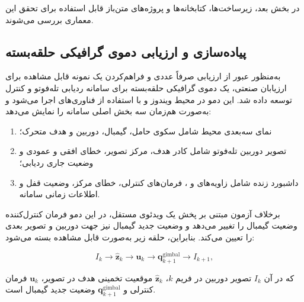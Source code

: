 \documentclass[12pt,a4paper]{article}
\begin{document}
	
	در بخش بعد، زیرساخت‌ها، کتابخانه‌ها و پروژه‌های متن‌باز قابل
	استفاده برای تحقق این معماری بررسی می‌شوند.













\subsection{پیاده‌سازی و ارزیابی دموی گرافیکی حلقه‌بسته}
\label{subsec:graphical_closed_loop_demo}

به‌منظور عبور از ارزیابی صرفاً عددی و فراهم‌کردن یک نمونه قابل
مشاهده برای ارزیابان صنعتی، یک دموی گرافیکی حلقه‌بسته برای سامانه
ردیابی تله‌فوتو و کنترل  توسعه داده شد. این دمو در
محیط ویندوز و با استفاده از فناوری‌های
اجرا می‌شود و به‌صورت هم‌زمان سه بخش اصلی سامانه را نمایش می‌دهد:

\begin{enumerate}
	\item
	نمای سه‌بعدی محیط شامل سکوی حامل، گیمبال، دوربین و هدف متحرک؛
	
	\item
	تصویر دوربین تله‌فوتو شامل کادر هدف، مرکز تصویر، خطای افقی و
	عمودی و وضعیت جاری ردیابی؛
	
	\item
	داشبورد زنده شامل زاویه‌های  و ، فرمان‌های
	کنترلی، خطای مرکز، وضعیت قفل و اطلاعات زمانی سامانه.
\end{enumerate}

برخلاف آزمون مبتنی بر پخش یک ویدئوی مستقل، در این دمو فرمان
کنترل‌کننده وضعیت گیمبال را تغییر می‌دهد و وضعیت جدید گیمبال نیز
جهت دوربین و تصویر بعدی را تعیین می‌کند. بنابراین، حلقه زیر به‌صورت
قابل مشاهده بسته می‌شود:

\begin{equation}
	I_k
	\longrightarrow
	\widehat{\mathbf z}_k
	\longrightarrow
	\mathbf u_k
	\longrightarrow
	\mathbf q^{\mathrm{gimbal}}_{k+1}
	\longrightarrow
	I_{k+1},
	\label{eq:implemented_demo_loop}
\end{equation}

که در آن
\(I_k\)
تصویر دوربین در فریم \(k\)،
\(\widehat{\mathbf z}_k\)
موقعیت تخمینی هدف در تصویر،
\(\mathbf u_k\)
فرمان کنترلی و
\(\mathbf q^{\mathrm{gimbal}}_{k+1}\)
وضعیت جدید گیمبال است.
\end{document}
